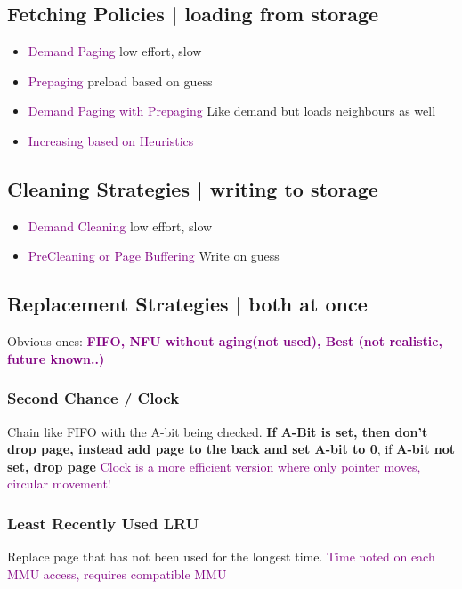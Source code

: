\documentclass[main.tex,fontsize=8pt,paper=a4,paper=landscape,DIV=calc,]{scrartcl}
\begin{document}
\begin{multicols*}{4}
\subsection{Fetching Policies | loading from storage}
\begin{itemize}
\item \textcolor{purple}{Demand Paging} low effort, slow
\item \textcolor{purple}{Prepaging} preload based on guess
\item \textcolor{purple}{Demand Paging with Prepaging}\newline
  Like demand but loads neighbours as well
\item \textcolor{purple}{Increasing based on Heuristics}
\end{itemize} 

\subsection{Cleaning Strategies | writing to storage}
\begin{itemize}
\item \textcolor{purple}{Demand Cleaning} low effort, slow
\item \textcolor{purple}{PreCleaning or Page Buffering} Write on guess
\end{itemize} 

\subsection{Replacement Strategies | both at once}
Obvious ones: \textbf{\textcolor{purple}{FIFO, NFU without aging(not used), Best (not realistic, future known..)}}
\subsubsection{Second Chance / Clock}
Chain like FIFO with the A-bit being checked.\newline
\textbf{If A-Bit is set, then don't drop page, instead add page to the back and set A-bit to 0}, if \textbf{A-bit not set, drop page}\newline
\textcolor{purple}{Clock is a more efficient version where only pointer moves, circular movement!}\newline

\subsubsection{Least Recently Used LRU}
Replace page that has not been used for the longest time.\newline
\textcolor{purple}{Time noted on each MMU access, requires compatible MMU}


\end{multicols*}
\end{document}
